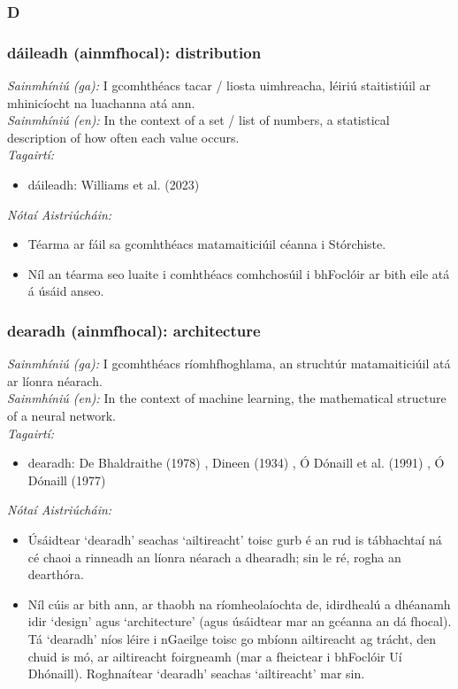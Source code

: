  \subsubsection*{D}

\subsubsection*{dáileadh (ainmfhocal): distribution}
 \noindent \textit{Sainmhíniú (ga):} I gcomhthéacs tacar / liosta uimhreacha, léiriú staitistiúil ar mhinicíocht na luachanna atá ann.
\\
 \noindent \textit{Sainmhíniú (en):} In the context of a set / list of numbers, a statistical description of how often each value occurs.
\\
 \noindent \textit{Tagairtí:}
\begin{itemize}
	\item dáileadh: Williams et al. (2023) \cite{storchiste}
\end{itemize}

 \noindent \textit{Nótaí Aistriúcháin:}
\begin{itemize}
	\item Téarma ar fáil sa gcomhthéacs matamaiticiúil céanna i Stórchiste.
	\item Níl an téarma seo luaite i comhthéacs comhchosúil i bhFoclóir ar bith eile atá á úsáid anseo.
\end{itemize}


\subsubsection*{dearadh (ainmfhocal): architecture}
 \noindent \textit{Sainmhíniú (ga):} I gcomhthéacs ríomhfhoghlama, an struchtúr matamaiticiúil atá ar líonra néarach.
\\
 \noindent \textit{Sainmhíniú (en):} In the context of machine learning, the mathematical structure of a neural network.
\\
 \noindent \textit{Tagairtí:}
\begin{itemize}
	\item dearadh: De Bhaldraithe (1978) \cite{de-bhaldraithe}, Dineen (1934) \cite{dineen}, Ó Dónaill et al. (1991) \cite{focloir-beag}, Ó Dónaill (1977) \cite{odonaill}
\end{itemize}

 \noindent \textit{Nótaí Aistriúcháin:}
\begin{itemize}
	\item Úsáidtear `dearadh' seachas `ailtireacht' toisc gurb é an rud is tábhachtaí ná cé chaoi a rinneadh an líonra néarach a dhearadh; sin le ré, rogha an dearthóra.
	\item Níl cúis ar bith ann, ar thaobh na ríomheolaíochta de, idirdhealú a dhéanamh idir `design' agus `architecture' (agus úsáidtear mar an gcéanna an dá fhocal). Tá `dearadh' níos léire i nGaeilge toisc go mbíonn ailtireacht ag trácht, den chuid is mó, ar ailtireacht foirgneamh (mar a fheictear i bhFoclóir Uí Dhónaill). Roghnaítear `dearadh' seachas `ailtireacht' mar sin.
\end{itemize}


